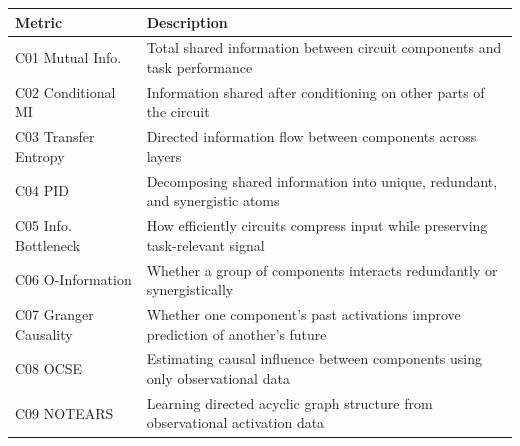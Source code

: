 \documentclass{article}
\begin{document}
\begin{minipage}{\linewidth}
\par
\begin{center}

\begin{tabular}{@{}lp{10cm}@{}}
\toprule
\textbf{Metric} & \textbf{Description} \\
\midrule
C01 Mutual Info. & Total shared information between circuit components and task performance \\
\midrule
C02 Conditional MI & Information shared after conditioning on other parts of the circuit \\
\midrule
C03 Transfer Entropy & Directed information flow between components across layers \\
\midrule
C04 PID & Decomposing shared information into unique, redundant, and synergistic atoms \\
\midrule
C05 Info. Bottleneck & How efficiently circuits compress input while preserving task-relevant signal \\
\midrule
C06 O-Information & Whether a group of components interacts redundantly or synergistically \\
\midrule
C07 Granger Causality & Whether one component's past activations improve prediction of another's future \\
\midrule
C08 OCSE & Estimating causal influence between components using only observational data \\
\midrule
C09 NOTEARS & Learning directed acyclic graph structure from observational activation data \\
\bottomrule
\end{tabular}
\end{center}
\end{minipage}
\end{document}
